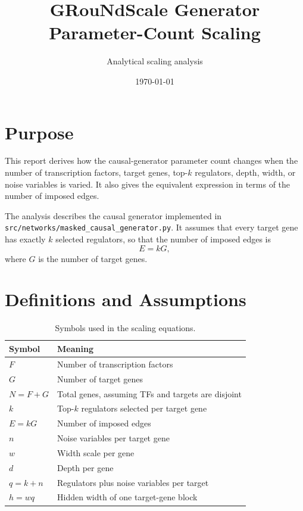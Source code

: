 \documentclass[11pt]{article}
\title{GRouNdScale Generator Parameter-Count Scaling}
\author{Analytical scaling analysis}
\date{\today}
\begin{document}
\maketitle

\section{Purpose}

This report derives how the causal-generator parameter count changes when the number of
transcription factors, target genes, top-$k$ regulators, depth, width, or noise variables is
varied. It also gives the equivalent expression in terms of the number of imposed edges.

The analysis describes the causal generator implemented in
\texttt{src/networks/masked\_causal\_generator.py}. It assumes that every target gene has exactly
$k$ selected regulators, so that the number of imposed edges is
\begin{equation}
E = kG,
\end{equation}
where $G$ is the number of target genes.

\section{Definitions and Assumptions}

\begin{table}[H]
\centering
\caption{Symbols used in the scaling equations.}
\begin{tabular}{ll}
\toprule
Symbol & Meaning \\
\midrule
$F$ & Number of transcription factors \\
$G$ & Number of target genes \\
$N=F+G$ & Total genes, assuming TFs and targets are disjoint \\
$k$ & Top-$k$ regulators selected per target gene \\
$E=kG$ & Number of imposed edges \\
$n$ & Noise variables per target gene \\
$w$ & Width scale per gene \\
$d$ & Depth per gene \\
$q=k+n$ & Regulators plus noise variables per target \\
$h=wq$ & Hidden width of one target-gene block \\
\bottomrule
\end{tabular}
\end{table}
\end{document}
